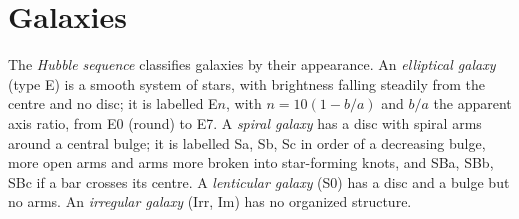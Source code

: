 \section{Galaxies}\label{sec:b3:milky-way-galaxies:galaxies}

\begin{definition}\label{def:b3:milky-way-galaxies:types}
The \emph{Hubble sequence} classifies galaxies by
their appearance. An \emph{elliptical galaxy}
(type E) is a smooth system of stars, with brightness falling steadily
from the centre and no disc; it is labelled E$n$, with $n = 10(1 - b/a)$
and $b/a$ the apparent axis ratio, from E0 (round) to E7. A
\emph{spiral galaxy} has a disc with spiral arms
around a central bulge; it is labelled Sa, Sb, Sc in order of a decreasing
bulge, more open arms and arms more broken into star-forming knots, and
SBa, SBb, SBc if a bar crosses its centre. A \emph{lenticular
galaxy} (S0) has a disc and a bulge but no arms.
An \emph{irregular galaxy} (Irr, Im) has no
organized structure.
\end{definition}

